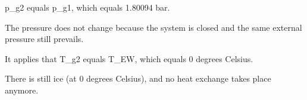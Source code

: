 p_g2 equals p_g1, which equals 1.80094 bar.  

The pressure does not change because the system is closed and the same external pressure still prevails.  

It applies that T_g2 equals T_EW, which equals 0 degrees Celsius.  

There is still ice (at 0 degrees Celsius), and no heat exchange takes place anymore.